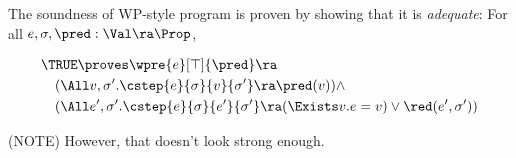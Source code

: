 The soundness of WP-style program is proven by showing that it is \emph{adequate}: For all $e, \sigma, \pred: \Val \ra \Prop$,

\begin{align*}
&\TRUE \proves \wpre{e}[\top]{\pred} \ra \\
&\quad (\All v, \sigma'. \cstep{e}{\sigma}{v}{\sigma'} \ra \pred(v)) \land \\
&\quad (\All e', \sigma'. \cstep{e}{\sigma}{e'}{\sigma'} \ra (\Exists v. e = v) \lor \red(e', \sigma'))
\end{align*}

(NOTE) However, that doesn't look strong enough.


